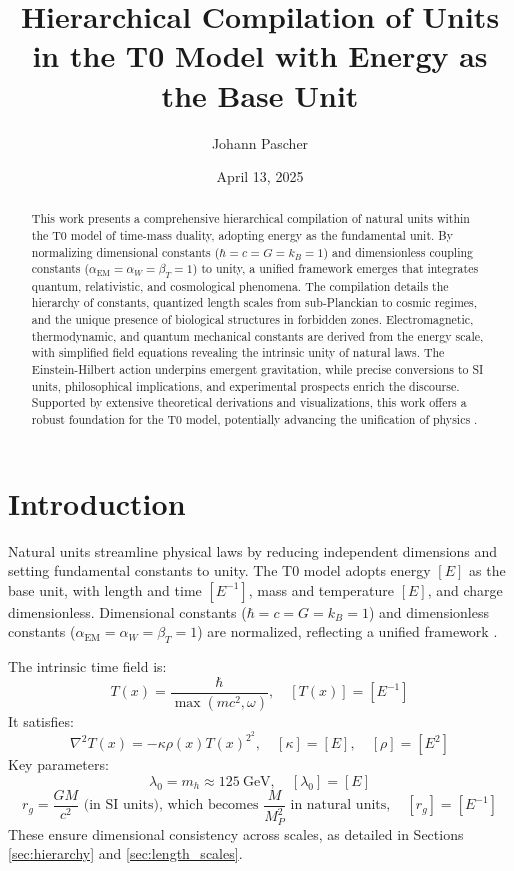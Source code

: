 ﻿\documentclass[12pt,a4paper]{article}
\newcommand{\Tfield}{T(x)}
\begin{document}
	
	\title{Hierarchical Compilation of Units in the T0 Model with Energy as the Base Unit}
	\author{Johann Pascher}
	\date{April 13, 2025}
	
	\maketitle
	
	\begin{abstract}
		This work presents a comprehensive hierarchical compilation of natural units within the T0 model of time-mass duality, adopting energy as the fundamental unit. By normalizing dimensional constants (\(\hbar = c = G = k_B = 1\)) and dimensionless coupling constants (\(\alpha_{\text{EM}} = \alpha_W = \beta_T = 1\)) to unity, a unified framework emerges that integrates quantum, relativistic, and cosmological phenomena. The compilation details the hierarchy of constants, quantized length scales from sub-Planckian to cosmic regimes, and the unique presence of biological structures in forbidden zones. Electromagnetic, thermodynamic, and quantum mechanical constants are derived from the energy scale, with simplified field equations revealing the intrinsic unity of natural laws. The Einstein-Hilbert action underpins emergent gravitation, while precise conversions to SI units, philosophical implications, and experimental prospects enrich the discourse. Supported by extensive theoretical derivations and visualizations, this work offers a robust foundation for the T0 model, potentially advancing the unification of physics \cite{pascher_alphabeta_2025}.
	\end{abstract}
	
	\tableofcontents
	\newpage
	
	\section{Introduction}
	\label{sec:introduction}
	
	Natural units streamline physical laws by reducing independent dimensions and setting fundamental constants to unity. The T0 model adopts energy \([E]\) as the base unit, with length and time \([E^{-1}]\), mass and temperature \([E]\), and charge dimensionless. Dimensional constants (\(\hbar = c = G = k_B = 1\)) and dimensionless constants (\(\alpha_{\text{EM}} = \alpha_W = \beta_T = 1\)) are normalized, reflecting a unified framework \cite{pascher_zeit_2025}.
	
	The intrinsic time field is:
	\[
	\Tfield = \frac{\hbar}{\max(m c^2, \omega)}, \quad [\Tfield] = [E^{-1}]
	\]
	It satisfies:
	\[
	\nabla^2 \Tfield = -\kappa \rho(x) \Tfield^2^2, \quad [\kappa] = [E], \quad [\rho] = [E^2]
	\]
	Key parameters:
	\[
	\lambda_0 = m_h \approx \SI{125}{\giga\electronvolt}, \quad [\lambda_0] = [E]
	\]
	\[
	r_g = \frac{GM}{c^2} \text{ (in SI units), which becomes } \frac{M}{M_P^2} \text{ in natural units}, \quad [r_g] = [E^{-1}]
	\]
	These ensure dimensional consistency across scales, as detailed in Sections \ref{sec:hierarchy} and \ref{sec:length_scales}.
	
\end{document}
